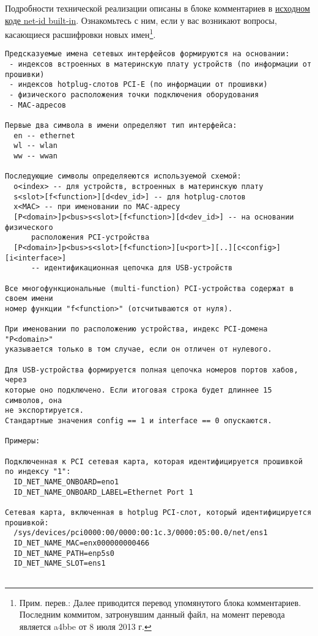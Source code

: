 \documentclass[10pt,oneside,a4paper]{article}
\begin{document}
Подробности технической реализации описаны в блоке комментариев в
\href{http://cgit.freedesktop.org/systemd/systemd/tree/src/udev/udev-builtin-net_id.c#n20}%
{исходном коде net-id built-in}. Ознакомьтесь с ним, если у вас возникают
вопросы, касающиеся расшифровки новых имен\footnote{Прим. перев.: Далее
приводится перевод упомянутого блока комментариев. Последним коммитом,
затронувшим данный файл, на момент перевода является a4bbe от 8 июля
2013 г.}.

\begin{Verbatim}
Предсказуемые имена сетевых интерфейсов формируются на основании:
 - индексов встроенных в материнскую плату устройств (по информации от прошивки)
 - индексов hotplug-слотов PCI-E (по информации от прошивки)
 - физического расположения точки подключения оборудования
 - MAC-адресов

Первые два символа в имени определяют тип интерфейса:
  en -- ethernet
  wl -- wlan
  ww -- wwan

Последующие символы определяеются используемой схемой:
  o<index> -- для устройств, встроенных в материнскую плату
  s<slot>[f<function>][d<dev_id>] -- для hotplug-слотов
  x<MAC> -- при именовании по MAC-адресу
  [P<domain>]p<bus>s<slot>[f<function>][d<dev_id>] -- на основании физического
      расположения PCI-устройства
  [P<domain>]p<bus>s<slot>[f<function>][u<port>][..][c<config>][i<interface>]
      -- идентификационная цепочка для USB-устройств

Все многофункциональные (multi-function) PCI-устройства содержат в своем имени
номер функции "f<function>" (отсчитываются от нуля).

При именовании по расположению устройства, индекс PCI-домена "P<domain>"
указывается только в том случае, если он отличен от нулевого.

Для USB-устройства формируется полная цепочка номеров портов хабов, через
которые оно подключено. Если итоговая строка будет длиннее 15 символов, она
не экспортируется.
Стандартные значения config == 1 и interface == 0 опускаются.

Примеры:

Подключенная к PCI сетевая карта, которая идентифицируется прошивкой
по индексу "1":
  ID_NET_NAME_ONBOARD=eno1
  ID_NET_NAME_ONBOARD_LABEL=Ethernet Port 1

Сетевая карта, включенная в hotplug PCI-слот, который идентифицируется
прошивкой:
  /sys/devices/pci0000:00/0000:00:1c.3/0000:05:00.0/net/ens1
  ID_NET_NAME_MAC=enx000000000466
  ID_NET_NAME_PATH=enp5s0
  ID_NET_NAME_SLOT=ens1


\end{Verbatim}
\end{document}
